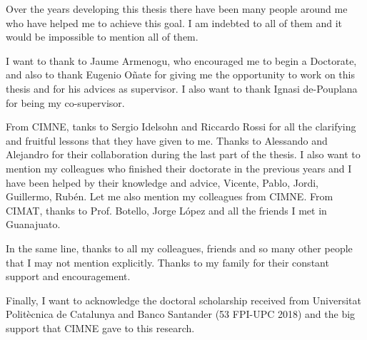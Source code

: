 \documentclass[
11pt,                   %
english,                %
singlespacing,          %
headsepline,            %
]{MastersDoctoralThesis}
\begin{document}

\begin{acknowledgements}
Over the years developing this thesis there have been many people around me who have helped me to achieve this goal. 
I am indebted to all of them and it would be impossible to mention all of them.

I want to thank to Jaume Armenogu, who encouraged me to begin a Doctorate, and also to thank Eugenio Oñate for giving me the opportunity to work on this thesis and for his advices as supervisor. I also want to thank Ignasi de-Pouplana for being my co-supervisor.

From CIMNE, tanks to Sergio Idelsohn and Riccardo Rossi for all the clarifying and fruitful lessons that they have given to me. Thanks to Alessando and Alejandro for their collaboration during the last part of the thesis. I also want to mention my colleagues who finished their doctorate in the previous years and I have been helped by their knowledge and advice, Vicente, Pablo, Jordi, Guillermo, Rubén. Let me also mention my colleagues from CIMNE. From CIMAT, thanks to Prof. Botello, Jorge López and all the friends I met in Guanajuato.

In the same line, thanks to all my colleagues, friends and so many other people that I may
not mention explicitly. Thanks to my family for their constant support and encouragement.

Finally, I want to acknowledge the doctoral scholarship received from Universitat Politècnica de Catalunya and Banco Santander (53 FPI-UPC 2018) and the big support that CIMNE gave to this research.
\end{acknowledgements}



\tableofcontents %

\listoffigures %

\listoftables %


\end{document}
